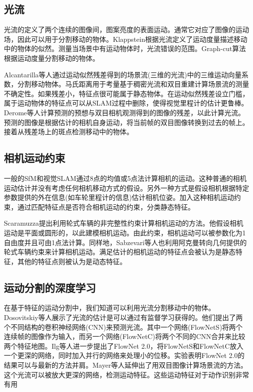 \subsection{光流}
光流的定义了两个连续的图像间，图案亮度的表面运动\cite{Horn1980Determining}。通常它对应了图像的运动场，因此可以用于分割移动的物体。Klappstein\cite{Klappstein2008Moving}根据光流定义了运动度量描述移动中的物体的似然。测量当场景中有运动物体时，光流错误的范围。Graph-cut算法根据运动度量分割移动的物体。

Alcantarilla等人\cite{Alcantarilla2012On}通过运动似然残差得到的场景流(三维的光流)中的三维运动向量系数，分割移动物体。马氏距离用于考量基于稠密光流和双目重建计算场景流的测量不确定性。如果残差小，特征点很可能属于静态物体。在运动似然残差设立门槛，属于运动物体的特征点可以从SLAM过程中删除，使得视觉里程计的估计更鲁棒。Derome等人\cite{Derome2015Moving, Derome2014Real}计算预测的预想与双目相机观测得到的图像的残差，以此计算光流。预测的图像是根据估计的相机自身运动，将当前帧的双目图像转换到过去的帧上。接着从残差场上的斑点检测移动中的物体。

\subsection{相机运动约束}
一般的SfM和视觉SLAM通过8点的均值\cite{Longuet1981A}或5点法\cite{David2004An}计算相机的运动。这种普通的相机运动估计并没有考虑任何相机移动方式的假设。另外一种方式是假设相机根据特定参数提供的外在信息(如车轮里程计的信息)估计相机位姿。加入这种相机运动约束，通过匹配特征点是否符合相机运动的约束，分类静态特征。

Scaramuzza\cite{Scaramuzza20111}提出利用轮式车辆的非完整性约束计算相机运动的方法。他假设相机运动是平面或圆形的，以此建模相机运动。由此约束，相机运动可以被参数化为1自由度并且可由1点法计算\cite{Scaramuzza2009Real}。同样地，Sabzevari等人\cite{Sabzevari2016Multi}也利用阿克曼转向几何提供的轮式车辆约束来计算相机运动。满足估计的相机运动的特征点会被认为是静态特征，其他的特征点则被认为是动态特征。

\subsection{运动分割的深度学习}
在基于特征的运动分割中，我们知道可以利用光流分割移动中的物体。Dosovitskiy等人\cite{Fischer2015FlowNet}展示了光流的估计是可以通过有监督学习获得的。他们提出了两个不同结构的卷积神经网络(CNN)来预测光流。其中一个网络(FlowNetS)将两个连续帧的图像作为输入，而另一个网络(FlowNetC)将两个不同的CNN合并来比较两个特征地图。Ilg等人\cite{Ilg2017FlowNet}进一步提出了FlowNet 2.0，将FlowNetS和FlowNetC放入一个更深的网络，同时加入并行的网络来处理小的位移。实验表明FlowNet 2.0的结果可以与最新的方法并肩。Mayer等人\cite{Mayer2016A}延伸出了用双目图像计算场景流的方法。这个光流可以被放大更深的网络，检测运动特征\cite{Gladh2016Deep}。这些运动特征对于动作识别非常有用\cite{Gkioxari2014Finding,Simonyan2014Two}

